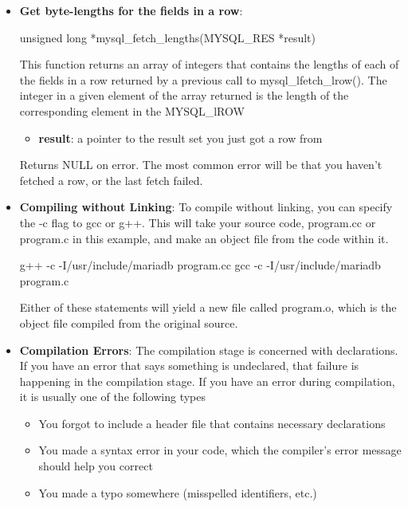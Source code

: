 \documentclass{report}
\begin{document}
\begin{itemize}
        \item \textbf{Get byte-lengths for the fields in a row}:
            \bigbreak \noindent 
            \begin{cppcode}
            unsigned long *mysql_fetch_lengths(MYSQL_RES *result)
            \end{cppcode}
            \bigbreak \noindent 
            This function returns an array of integers that contains the lengths of each of the fields in a row returned by a previous call to mysql\_lfetch\_lrow(). The integer in a given element of the array returned is the length of the corresponding element in the MYSQL\_lROW
            \bigbreak \noindent 
            \begin{itemize}
                \item \textbf{result}:  a pointer to the result set you just got a row from
            \end{itemize}
            \bigbreak \noindent 
            Returns NULL on error. The most common error will be that you haven't fetched a row, or the last fetch failed.
        \item \textbf{Compiling without Linking}: To compile without linking, you can specify the -c flag to gcc or g++. This will take your source code, program.cc or program.c in this example, and make an object file from the code within it.
            \bigbreak \noindent 
            \begin{cppcode}
                g++ -c -I/usr/include/mariadb program.cc
                gcc -c -I/usr/include/mariadb program.c
            \end{cppcode}
            \bigbreak \noindent 
            Either of these statements will yield a new file called program.o, which is the object file compiled from the original source.
        \item \textbf{Compilation Errors}: The compilation stage is concerned with declarations. If you have an error that says something is undeclared, that failure is happening in the compilation stage.
            \bigbreak \noindent 
            If you have an error during compilation, it is usually one of the following types
            \begin{itemize}
                \item You forgot to include a header file that contains necessary declarations
                \item You made a syntax error in your code, which the compiler's error message should help you correct
                \item You made a typo somewhere (misspelled identifiers, etc.)

\end{itemize}
\end{itemize}
\end{document}
